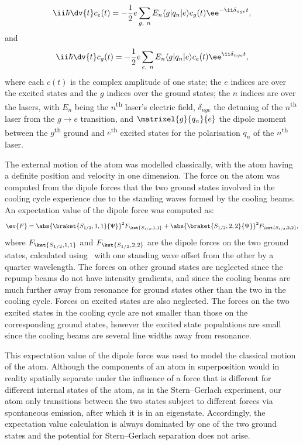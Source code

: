 \begin{equation}
\ii\hbar\dv{t} c_e(t) = -\frac12e\sum_{g,\ n} E_n \langle g |  q_n | e \rangle c_g(t) \ee^{-\ii\delta_{nge}t},
\end{equation}
and
\begin{equation}
\ii\hbar\dv{t} c_g(t) = -\frac12e\sum_{e,\ n} E_n \langle g |  q_n | e \rangle c_e(t) \ee^{\ii\delta_{nge}t},
\end{equation}
where each $c(t)$ is the complex amplitude of one state; the $e$ indices are over the excited states and the $g$ indices over the ground states; the $n$ indices are over the lasers, with $E_n$ being the $n$\textsuperscript{th} laser's electric field, $\delta_{nge}$ the detuning of the $n$\textsuperscript{th} laser from the $g\rightarrow e$ transition, and $\matrixel{g}{q_n}{e}$ the dipole moment between the $g$\textsuperscript{th} ground and $e$\textsuperscript{th} excited states for the polarisation $q_n$ of the $n$\textsuperscript{th} laser.

The external motion of the atom was modelled classically, with the atom having a definite position and velocity in one dimension. The force on the atom was computed from the dipole forces that the two ground states involved in the cooling cycle experience due to the standing waves formed by the cooling beams. An expectation value of the dipole force was computed as:
\begin{align}
\ev{F} = \abs{\braket{S_{1/2},1, 1}{\Psi}}^2F_{\ket{S_{1/2},1, 1}} + \abs{\braket{S_{1/2}, 2, 2}{\Psi}}^2F_{\ket{S_{1/2},2, 2}},
\end{align}
where $F_{\ket{S_{1/2}, 1, 1}}$ and $F_{\ket{S_{1/2}, 2, 2}}$ are the dipole forces on the two ground states, calculated using~\cite[eqn 3.16, p 33]{metcalf_laser_1999} with one standing wave offset from the other by a quarter wavelength. The forces on other ground states are neglected since the repump beams do not have intensity gradients, and since the cooling beams are much further away from resonance for ground states other than the two in the cooling cycle. Forces on excited states are also neglected. The forces on the two excited states in the cooling cycle are not smaller than those on the corresponding ground states, however the excited state populations are small since the cooling beams are several line widths away from resonance.

This expectation value of the dipole force was used to model the classical motion of the atom. Although the components of an atom in superposition would in reality spatially separate under the influence of a force that is different for different internal states of the atom, as in the Stern--Gerlach experiment, our atom only transitions between the two states subject to different forces via spontaneous emission, after which it is in an eigenstate. Accordingly, the expectation value calculation is always dominated by one of the two ground states and the potential for Stern--Gerlach separation does not arise.

